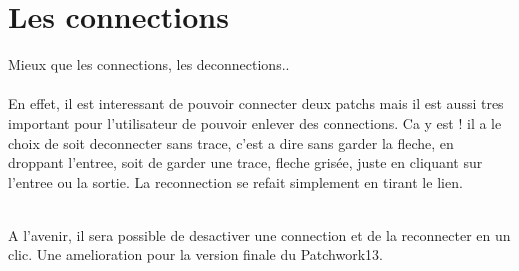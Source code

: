 \section{Les connections}
\par
Mieux que les connections, les deconnections..
\\
\\
En effet, il est interessant de pouvoir connecter deux patchs mais il est
aussi tres important pour l'utilisateur de pouvoir enlever des connections.
Ca y est ! il a le choix de soit deconnecter sans trace, c'est a dire sans
garder la fleche, en droppant l'entree, soit de garder une trace, fleche
gris\'ee, juste en cliquant sur l'entree ou la sortie. La reconnection se
refait simplement en tirant le lien.
\\
\\
\par
A l'avenir, il sera possible de desactiver une connection et de la reconnecter
en un clic. Une amelioration pour la version finale du Patchwork13.
\\
\\

